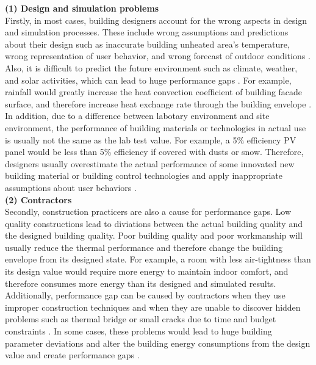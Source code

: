 \documentclass[a4paper, oneside]{discothesis}
\begin{document}
		\textbf{(1) Design and simulation problems}\\
		Firstly, in most cases, building designers account for the wrong aspects in design and simulation processes. These include wrong assumptions and predictions about their design such as inaccurate building unheated area's temperature, wrong representation of user behavior, and wrong forecast of outdoor conditions \cite{NIU2016275,HOFFMANN201731}. Also, it is difficult to predict the future environment such as climate, weather, and solar activities, which can lead to huge performance gaps \cite{DIAZ2017393,doi:10.1080/19401493.2012.718797}. For example, rainfall would greatly increase the heat convection coefficient of building facade surface, and therefore increase heat exchange rate through the building envelope \cite{DIAZ2017393}. In addition, due to a difference between labotary environment and site environment, the performance of building materials or technologies in actual use is usually not the same as the lab test value. For example, a 5\% efficiency PV panel would be less than 5\% efficiency if covered with dusts or snow. Therefore, designers usually overestimate the actual performance of some innovated new building material or building control technologies and apply inappropriate assumptions about user behaviors \cite{DEWILDE201440}. \\

		\textbf{(2) Contractors}\\
		Secondly, construction practicers are also a cause for performance gaps. Low quality constructions lead to diviations between the actual building quality and the designed building quality. Poor building quality and poor workmanship will usually reduce the thermal performance and therefore change the building envelope from its designed state. For example, a room with less air-tightness than its design value would require more energy to maintain indoor comfort, and therefore consumes more energy than its designed and simulated results. Additionally, performance gap can be caused by contractors when they use improper construction techniques and when they are unable to discover hidden problems such as thermal bridge or small cracks due to time and budget constraints \cite{DEWILDE201440}. In some cases, these problems would lead to huge building parameter deviations and alter the building energy consumptions from the design value and create performance gaps \cite{FREI2017421,DEWILDE201440}.\\ 
\end{document}
